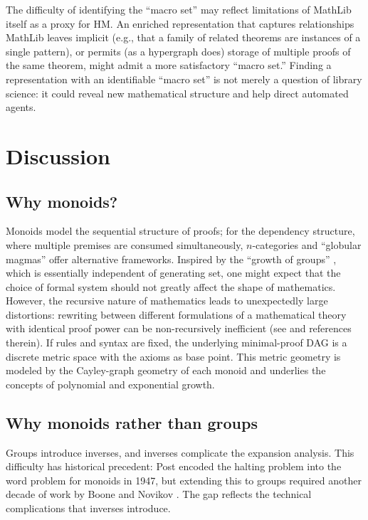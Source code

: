 \documentclass[12pt]{amsart}
\theoremstyle{definition}
\theoremstyle{remark}
\begin{document}
The difficulty of identifying the ``macro set'' may reflect limitations of MathLib itself as a proxy for HM.
An enriched representation that captures relationships MathLib leaves implicit (e.g., that a family of related theorems are instances of a single pattern), or permits (as a hypergraph does) storage of multiple proofs of the same theorem, might admit a more satisfactory ``macro set.''
Finding a representation with an identifiable ``macro set'' is not merely a question of library science: it could reveal new mathematical structure and help direct automated agents.

\section{Discussion}\label{discussion_section}

\subsection{Why monoids?}

Monoids model the sequential structure of proofs; for the dependency structure, where multiple premises are consumed simultaneously, $n$-categories and ``globular magmas'' offer alternative frameworks.
Inspired by the ``growth of groups'' \cite{Milnor1968}, which is essentially independent of generating set, one might expect that the choice of formal system should not greatly affect the shape of mathematics.
However, the recursive nature of mathematics leads to unexpectedly large distortions: rewriting between different formulations of a mathematical theory with identical proof power can be non-recursively 
inefficient (see \cite{BDF} and references therein).
If rules and syntax are fixed, the underlying minimal-proof DAG is a discrete metric space with the axioms as base point.
This metric geometry is modeled by the Cayley-graph geometry of each monoid and underlies the concepts of polynomial and exponential growth.

\subsection{Why monoids rather than groups}

Groups introduce inverses, and inverses complicate the expansion analysis.
This difficulty has historical precedent: Post \cite{Post} encoded the halting problem into the word problem for monoids in 1947, but extending this to groups required another decade of work by Boone and Novikov \cite{Novikov1955, Boone1959}.
The gap reflects the technical complications that inverses introduce.
\end{document}
